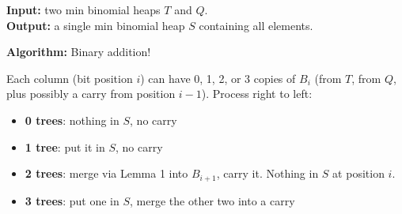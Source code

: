 \documentclass[11pt]{article}
\begin{document}
\begin{defbox}[Union($T$, $Q$)]
\textbf{Input:} two min binomial heaps $T$ and $Q$.\\
\textbf{Output:} a single min binomial heap $S$ containing all elements.

\textbf{Algorithm:} Binary addition!

Each column (bit position $i$) can have 0, 1, 2, or 3 copies of $B_i$ (from $T$, from $Q$, plus possibly a carry from position $i-1$). Process right to left:
\begin{itemize}[leftmargin=1.4em,itemsep=2pt]
  \item \textbf{0 trees}: nothing in $S$, no carry
  \item \textbf{1 tree}: put it in $S$, no carry
  \item \textbf{2 trees}: merge via Lemma 1 into $B_{i+1}$, carry it. Nothing in $S$ at position $i$.
  \item \textbf{3 trees}: put one in $S$, merge the other two into a carry
\end{itemize}
\end{defbox}
\end{document}

